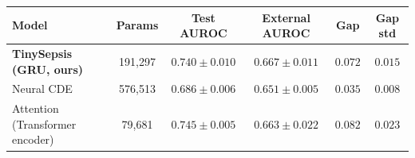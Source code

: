 \begin{tabular}{lccccc}
\toprule
Model & Params & Test AUROC & External AUROC & Gap & Gap std \\
\midrule
\textbf{TinySepsis (GRU, ours)} & 191{,}297 & $0.740 \pm 0.010$ & $0.667 \pm 0.011$ & $0.072$ & $0.015$ \\
Neural CDE & 576{,}513 & $0.686 \pm 0.006$ & $0.651 \pm 0.005$ & $\mathbf{0.035}$ & $\mathbf{0.008}$ \\
Attention (Transformer encoder) & 79{,}681 & $0.745 \pm 0.005$ & $0.663 \pm 0.022$ & $0.082$ & $0.023$ \\
\bottomrule
\end{tabular}
